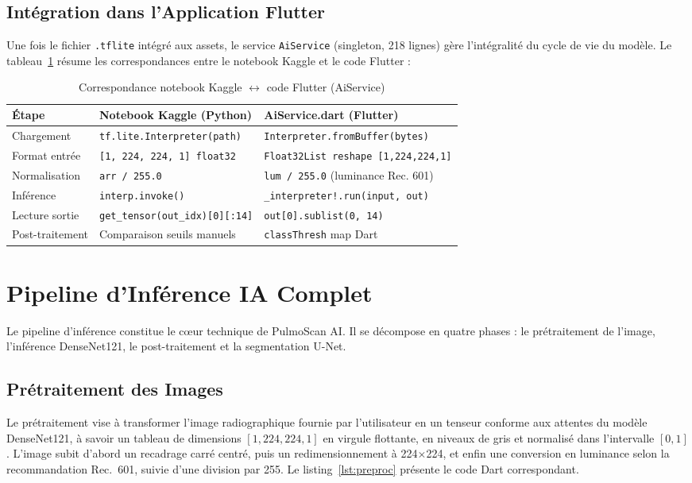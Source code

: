 \documentclass[12pt,a4paper]{report}
\begin{document}
\subsection{Intégration dans l'Application Flutter}

Une fois le fichier \texttt{.tflite} intégré aux assets, le service
\texttt{AiService} (singleton, 218 lignes) gère l'intégralité du cycle de vie
du modèle. Le tableau~\ref{tab:tflite_integration} résume les correspondances
entre le notebook Kaggle et le code Flutter :

\begin{table}[H]
\centering
\caption{Correspondance notebook Kaggle $\leftrightarrow$ code Flutter (AiService)}
\label{tab:tflite_integration}
\begin{tabularx}{\textwidth}{l X X}
\toprule
\textbf{Étape} & \textbf{Notebook Kaggle (Python)} & \textbf{AiService.dart (Flutter)} \\
\midrule
Chargement & \texttt{tf.lite.Interpreter(path)} & \texttt{Interpreter.fromBuffer(bytes)} \\
Format entrée & \texttt{[1, 224, 224, 1] float32} & \texttt{Float32List reshape [1,224,224,1]} \\
Normalisation & \texttt{arr / 255.0} & \texttt{lum / 255.0} (luminance Rec. 601) \\
Inférence & \texttt{interp.invoke()} & \texttt{\_interpreter!.run(input, out)} \\
Lecture sortie & \texttt{get\_tensor(out\_idx)[0][:14]} & \texttt{out[0].sublist(0, 14)} \\
Post-traitement & Comparaison seuils manuels & \texttt{classThresh} map Dart \\
\bottomrule
\end{tabularx}
\end{table}

\section{Pipeline d'Inférence IA Complet}
Le pipeline d'inférence constitue le cœur technique de PulmoScan AI. Il se décompose en quatre phases : le prétraitement de l'image, l'inférence DenseNet121, le post-traitement et la segmentation U-Net.

\subsection{Prétraitement des Images}
Le prétraitement vise à transformer l'image radiographique fournie par l'utilisateur en un tenseur conforme aux attentes du modèle DenseNet121, à savoir un tableau de dimensions $[1, 224, 224, 1]$ en virgule flottante, en niveaux de gris et normalisé dans l'intervalle $[0,1]$. L'image subit d'abord un recadrage carré centré, puis un redimensionnement à 224$\times$224, et enfin une conversion en luminance selon la recommandation Rec.~601, suivie d'une division par 255. Le listing~\ref{lst:preproc} présente le code Dart correspondant.
\end{document}
